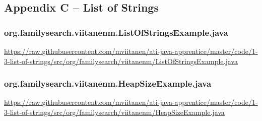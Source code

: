 \subsection*{Appendix C -- List of Strings} \label{App:AppendixC}

\subsubsection*{org.familysearch.viitanenm.ListOfStringsExample.java}
\noindent
\begin{minipage}{.6in}
\end{minipage}
\begin{minipage}{6in}
  \url{https://raw.githubusercontent.com/mviitanen/ati-java-apprentice/master/code/1-3-list-of-strings/src/org/familysearch/viitanenm/ListOfStringsExample.java}
\end{minipage}


\vspace{1em}
\subsubsection*{org.familysearch.viitanenm.HeapSizeExample.java}
\noindent
\begin{minipage}{.6in}
\end{minipage}
\begin{minipage}{6in}
  \url{https://raw.githubusercontent.com/mviitanen/ati-java-apprentice/master/code/1-3-list-of-strings/src/org/familysearch/viitanenm/HeapSizeExample.java}
\end{minipage}